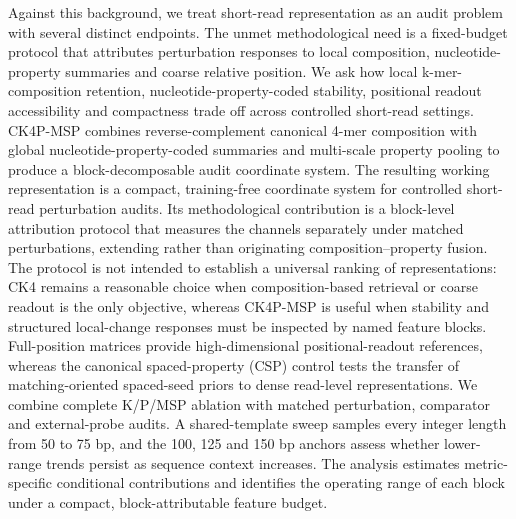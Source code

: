 Against this background, we treat short-read representation as an audit problem with several distinct endpoints. The unmet methodological need is a fixed-budget protocol that attributes perturbation responses to local composition, nucleotide-property summaries and coarse relative position. We ask how local k-mer-composition retention, nucleotide-property-coded stability, positional readout accessibility and compactness trade off across controlled short-read settings. CK4P-MSP combines reverse-complement canonical 4-mer composition with global nucleotide-property-coded summaries and multi-scale property pooling to produce a block-decomposable audit coordinate system. The resulting working representation is a compact, training-free coordinate system for controlled short-read perturbation audits. Its methodological contribution is a block-level attribution protocol that measures the channels separately under matched perturbations, extending rather than originating composition--property fusion. The protocol is not intended to establish a universal ranking of representations: CK4 remains a reasonable choice when composition-based retrieval or coarse readout is the only objective, whereas CK4P-MSP is useful when stability and structured local-change responses must be inspected by named feature blocks. Full-position matrices provide high-dimensional positional-readout references, whereas the canonical spaced-property (CSP) control tests the transfer of matching-oriented spaced-seed priors to dense read-level representations. We combine complete K/P/MSP ablation with matched perturbation, comparator and external-probe audits. A shared-template sweep samples every integer length from 50 to 75 bp, and the 100, 125 and 150 bp anchors assess whether lower-range trends persist as sequence context increases. The analysis estimates metric-specific conditional contributions and identifies the operating range of each block under a compact, block-attributable feature budget.
